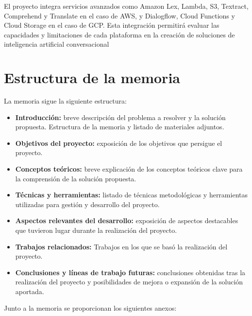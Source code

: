 El proyecto integra servicios avanzados como Amazon Lex, Lambda, S3, Textract, Comprehend y Translate en el caso de AWS, y Dialogflow, Cloud Functions y Cloud Storage en el caso de GCP. Esta integración permitirá evaluar las capacidades y limitaciones de cada plataforma en la creación de soluciones de inteligencia artificial conversacional 

\section{Estructura de la memoria}\label{estructura-de-la-memoria}

La memoria sigue la siguiente estructura:

\begin{itemize}
\tightlist
\item
  \textbf{Introducción:} breve descripción del problema a resolver y la
  solución propuesta. Estructura de la memoria y listado de materiales
  adjuntos.
\item
  \textbf{Objetivos del proyecto:} exposición de los objetivos que
  persigue el proyecto.
\item
  \textbf{Conceptos teóricos:} breve explicación de los conceptos
  teóricos clave para la comprensión de la solución propuesta.
\item
  \textbf{Técnicas y herramientas:} listado de técnicas metodológicas y
  herramientas utilizadas para gestión y desarrollo del proyecto.
\item
  \textbf{Aspectos relevantes del desarrollo:} exposición de aspectos
  destacables que tuvieron lugar durante la realización del proyecto.
\item
  \textbf{Trabajos relacionados:} Trabajos en los que se basó la realización del proyecto.
\item
  \textbf{Conclusiones y líneas de trabajo futuras:} conclusiones
  obtenidas tras la realización del proyecto y posibilidades de mejora o
  expansión de la solución aportada.
\end{itemize}
Junto a la memoria se proporcionan los siguientes anexos:

